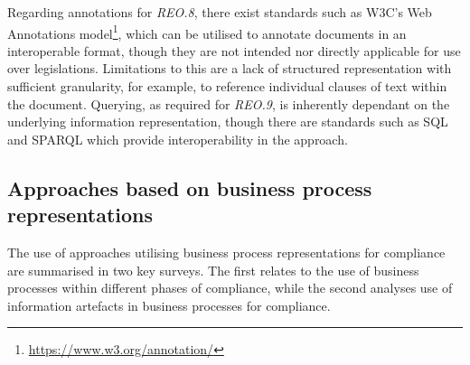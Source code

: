 Regarding annotations for \textit{REO.8}, there exist standards such as W3C's Web Annotations model\footnote{\url{https://www.w3.org/annotation/}}, which can be utilised to annotate documents in an interoperable format, though they are not intended nor directly applicable for use over legislations.
Limitations to this are a lack of structured representation with sufficient granularity, for example, to reference individual clauses of text within the document.
Querying, as required for \textit{REO.9}, is inherently dependant on the underlying information representation, though there are standards such as SQL and SPARQL which provide interoperability in the approach.

\subsection{Approaches based on business process representations}
The use of approaches utilising business process representations for compliance are summarised in two key surveys. The first \cite{fellmann_state---art_2014} relates to the use of business processes within different phases of compliance, while the second \cite{benyoucef_information_2015} analyses use of information artefacts in business processes for compliance.


